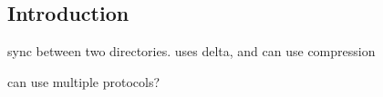 
\subsection{Introduction}


sync between two directories. uses delta, and can use compression

can use multiple protocols?
